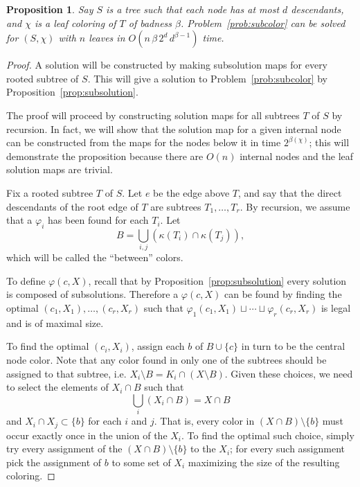 \documentclass{amsart}
\newcommand{\col}{\chi}
\newcommand{\subunion}{\sqcup}
\newcommand{\cut}{\kappa}
\newcommand{\bad}{\beta}
\newtheorem{prop}{Proposition}
\begin{document}
\begin{prop}
Say $S$ is a tree such that each node has at most $d$ descendants, and $\col$ is a leaf coloring of $T$ of badness $\beta$.
Problem~\ref{prob:subcolor} can be solved for $(S, \col)$ with $n$ leaves in $O(n \, \bad \, 2^d \, d^{\bad-1})$ time.
\end{prop}

\begin{proof}

A solution will be constructed by making subsolution maps for every rooted subtree of $S$.
This will give a solution to Problem~\ref{prob:subcolor} by Proposition~\ref{prop:subsolution}.

The proof will proceed by constructing solution maps for all subtrees $T$ of $S$ by recursion.
In fact, we will show that the solution map for a given internal node can be constructed from the maps for the nodes below it in time $2^{\bad(\col)}$;
this will demonstrate the proposition because there are $O(n)$ internal nodes and the leaf solution maps are trivial.

Fix a rooted subtree $T$ of $S$.
Let $e$ be the edge above $T$, and say that the direct descendants of the root edge of $T$ are subtrees $T_1,\ldots,T_r$.
By recursion, we assume that a $\varphi_i$ has been found for each $T_i$.
Let
\[
  B = \bigcup_{i,j} \left( \cut(T_i) \cap \cut(T_j) \right),
\]
which will be called the ``between'' colors.

To define $\varphi(c,X)$, recall that by Proposition~\ref{prop:subsolution} every solution is composed of subsolutions.
Therefore a $\varphi(c,X)$ can be found by finding the optimal $(c_1,X_1),\ldots,(c_r,X_r)$ such that $\varphi_1(c_1,X_1) \subunion \cdots \subunion \varphi_r(c_r,X_r)$ is legal and is of maximal size.

To find the optimal $(c_i, X_i)$, assign each $b$ of $B \cup \{c\}$ in turn to be the central node color.
Note that any color found in only one of the subtrees should be assigned to that subtree, i.e. $X_i \setminus B = K_i \cap (X \setminus B)$.
Given these choices, we need to select the elements of $X_i \cap B$ such that
\[
  \bigcup_{i} (X_i \cap B) = X \cap B
\]
and $X_i \cap X_j \subset \{b\}$ for each $i$ and $j$.
That is, every color in $(X \cap B) \setminus \{b\}$ must occur exactly once in the union of the $X_i$.
To find the optimal such choice, simply try every assignment of the $(X \cap B) \setminus \{b\}$ to the $X_i$; for every such assignment pick the assignment of $b$ to some set of $X_i$ maximizing the size of the resulting coloring.


\end{proof}
\end{document}
